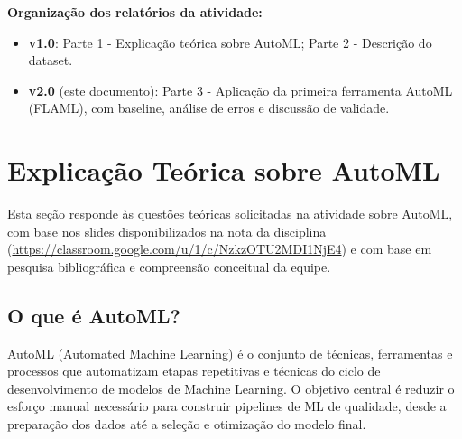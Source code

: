 \documentclass[11pt, a4paper, oneside]{article}
\begin{document}
\vspace{6mm}

\begin{infobox}
\textbf{Organização dos relatórios da atividade:}
\begin{itemize}[leftmargin=1.2cm, topsep=2pt, itemsep=2pt]
  \item \textbf{v1.0}: Parte 1 - Explicação teórica sobre AutoML; Parte 2 - Descrição do dataset.
  \item \textbf{v2.0} (este documento): Parte 3 - Aplicação da primeira ferramenta AutoML (FLAML), com baseline, análise de erros e discussão de validade.
\end{itemize}
\end{infobox}

\newpage

\tableofcontents
\newpage

\section{Explicação Teórica sobre AutoML}
\label{sec:automl-teoria}

\begin{infobox}
Esta seção responde às questões teóricas solicitadas na atividade sobre AutoML, com
base nos slides disponibilizados na nota da disciplina
(\url{https://classroom.google.com/u/1/c/NzkzOTU2MDI1NjE4}) e com base em
pesquisa bibliográfica e compreensão conceitual da equipe.
\end{infobox}

\subsection{O que é AutoML?}
\label{sec:o-que-e-automl}

AutoML (Automated Machine Learning) é o conjunto de técnicas, ferramentas e processos
que automatizam etapas repetitivas e técnicas do ciclo de desenvolvimento de modelos
de Machine Learning. O objetivo central é reduzir o esforço manual necessário para
construir pipelines de ML de qualidade, desde a preparação dos dados até a seleção e
otimização do modelo final.
\end{document}
